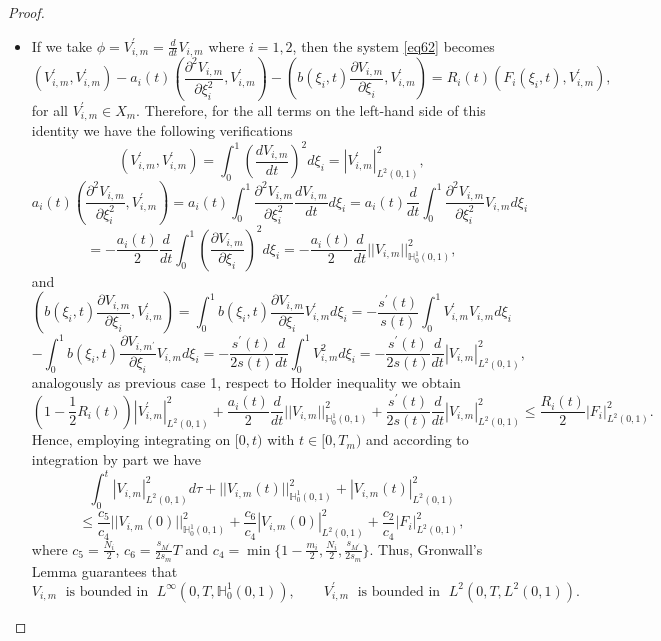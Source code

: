 \documentclass[10pt,a4paper]{amsart}
\begin{document}
\begin{proof}
\begin{itemize}
        \item[Case 2.] If we take $\phi=V_{i,m}^{\prime}=\frac{d}{dt}V_{i,m}$ where $i=1,2$, then the system \eqref{eq62} becomes
        $$\left(V_{i,m}^{\prime},V_{i,m}^{\prime}\right)-a_i(t)\left(\frac{\partial^2 V_{i,m}}{\partial \xi_i^2},V_{i,m}^{\prime}\right)-\left(b(\xi_i,t)\frac{\partial V_{i,m}}{\partial \xi_i},V_{i,m}^{\prime}\right)=R_i(t)\left(F_i(\xi_i,t),V_{i,m}^{\prime}\right),$$
        for all $V_{i,m}^{\prime}\in X_m$.
        Therefore, for the all terms on the left-hand side of this identity we have the following verifications
        $$\left(V_{i,m}^{\prime},V_{i,m}^{\prime}\right)=\int_0^1\left(\frac{dV_{i,m}}{dt}\right)^2 d\xi_i=|V_{i,m}^{\prime}|_{L^2(0,1)}^2,$$
        $$a_i(t)\left(\frac{\partial^2 V_{i,m}}{\partial \xi_i^2},V_{i,m}^{\prime}\right)=a_i(t)\int_0^1\frac{\partial^2V_{i,m}}{\partial\xi_i^2}\frac{dV_{i,m}}{dt}d\xi_i=a_i(t)\frac{d}{dt}\int_0^1\frac{\partial^2V_{i,m}}{\partial\xi_i^2} V_{i,m}d\xi_i$$
        $$=-\frac{a_i(t)}{2}\frac{d}{dt}\int_0^1\left(\frac{\partial V_{i,m}}{\partial\xi_i}\right)^2d\xi_i=-\frac{a_i(t)}{2}\frac{d}{dt}||V_{i,m}||_{\mathbb{H}_0^1(0,1)}^2,$$
        and 
        $$\left(b(\xi_i,t)\frac{\partial V_{i,m}}{\partial \xi_i},V_{i,m}^{\prime}\right)=\int_0^1 b(\xi_i,t)\frac{\partial V_{i,m}}{\partial \xi_i}V_{i,m}^{\prime}d\xi_i=-\frac{s^{\prime}(t)}{s(t)}\int_0^1 V_{i,m}^{\prime} V_{i,m}d\xi_i$$
        $$-\int_0^1 b(\xi_i,t)\frac{\partial V_{i,m^{\prime}}}{\partial \xi_i}V_{i,m}d\xi_i=-\frac{s^{\prime}(t)}{2s(t)}\frac{d}{dt}\int_0^1 V_{i,m}^2d\xi_i=-\frac{s^{\prime}(t)}{2s(t)}\frac{d}{dt}|V_{i,m}|_{L^2(0,1)}^2,$$
        analogously as previous case 1, respect to Holder inequality we obtain
        $$\left(1-\frac{1}{2}R_i(t)\right)|V_{i,m}^{\prime}|_{L^2(0,1)}^2+\frac{a_i(t)}{2}\frac{d}{dt}||V_{i,m}||_{\mathbb{H}_0^1(0,1)}^2+\frac{s^{\prime}(t)}{2s(t)}\frac{d}{dt}|V_{i,m}|_{L^2(0,1)}^2\leq\frac{R_i(t)}{2}|F_i|_{L^2(0,1)}^2.$$
        Hence, employing integrating on $[0,t)$ with $t\in[0,T_m)$ and according to integration by part we have
        $$\int_0^t |V_{i,m}|_{L^2(0,1)}^2d\tau+||V_{i,m}(t)||_{\mathbb{H}_0^1(0,1)}^2+|V_{i,m}(t)|_{L^2(0,1)}^2$$
        $$\leq\frac{c_5}{c_4}||V_{i,m}(0)||_{\mathbb{H}_0^1(0,1)}^2+\frac{c_6}{c_4}|V_{i,m}(0)|_{L^2(0,1)}^2+\frac{c_2}{c_4}|F_i|_{L^2(0,1)}^2,$$
        where $c_5=\frac{N_i}{2}$, $c_6=\frac{s_{M^{\prime}}}{2s_m}T$ and $c_4=\min\{1-\frac{m_i}{2},\frac{N_i}{2}, \frac{s_{M^{\prime}}}{2s_m}\}$. Thus, Gronwall's Lemma guarantees that
        $$V_{i,m}\;\text{ is bounded in }\; L^{\infty}(0,T,\mathbb{H}_0^1(0,1)),\quad\quad V_{i,m}^{\prime}\;\text{ is bounded in }\; L^2(0,T,L^2(0,1)).$$

\end{itemize}
\end{proof}
\end{document}
